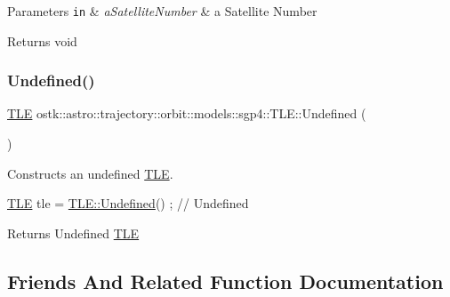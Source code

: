\begin{DoxyParams}[1]{Parameters}
\mbox{\tt in}  & {\em a\+Satellite\+Number} & a Satellite Number \\
\hline
\end{DoxyParams}
\begin{DoxyReturn}{Returns}
void 
\end{DoxyReturn}
\mbox{\label{classostk_1_1astro_1_1trajectory_1_1orbit_1_1models_1_1sgp4_1_1_t_l_e_a871cdedd5bc51c9f3afa976e0597ea51}} 
\subsubsection{\texorpdfstring{Undefined()}{Undefined()}}
{\footnotesize\ttfamily \hyperlink{classostk_1_1astro_1_1trajectory_1_1orbit_1_1models_1_1sgp4_1_1_t_l_e}{T\+LE} ostk\+::astro\+::trajectory\+::orbit\+::models\+::sgp4\+::\+T\+L\+E\+::\+Undefined (\begin{DoxyParamCaption}{ }\end{DoxyParamCaption})\hspace{0.3cm}{\ttfamily [static]}}



Constructs an undefined \hyperlink{classostk_1_1astro_1_1trajectory_1_1orbit_1_1models_1_1sgp4_1_1_t_l_e}{T\+LE}. 


\begin{DoxyCode}
\hyperlink{classostk_1_1astro_1_1trajectory_1_1orbit_1_1models_1_1sgp4_1_1_t_l_e_a57323db2c24577c2e8ddce79fa776d1e}{TLE} tle = \hyperlink{classostk_1_1astro_1_1trajectory_1_1orbit_1_1models_1_1sgp4_1_1_t_l_e_a871cdedd5bc51c9f3afa976e0597ea51}{TLE::Undefined}() ; \textcolor{comment}{// Undefined}
\end{DoxyCode}


\begin{DoxyReturn}{Returns}
Undefined \hyperlink{classostk_1_1astro_1_1trajectory_1_1orbit_1_1models_1_1sgp4_1_1_t_l_e}{T\+LE} 
\end{DoxyReturn}


\subsection{Friends And Related Function Documentation}
\mbox{\label{classostk_1_1astro_1_1trajectory_1_1orbit_1_1models_1_1sgp4_1_1_t_l_e_a54a7a3bca65674d5052031634f900984}} 
